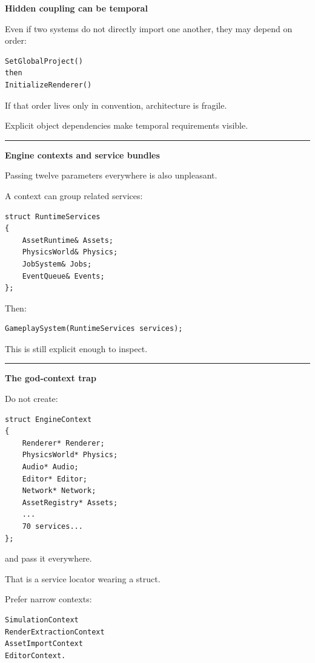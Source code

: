 \textbf{Hidden coupling can be temporal}

Even if two systems do not directly import one another, they may depend on order:

\begin{verbatim}
SetGlobalProject()
then
InitializeRenderer()
\end{verbatim}

If that order lives only in convention, architecture is fragile.

Explicit object dependencies make temporal requirements visible.

\begin{center}\rule{0.5\linewidth}{0.5pt}\end{center}

\textbf{Engine contexts and service bundles}

Passing twelve parameters everywhere is also unpleasant.

A context can group related services:

\begin{verbatim}
struct RuntimeServices
{
    AssetRuntime& Assets;
    PhysicsWorld& Physics;
    JobSystem& Jobs;
    EventQueue& Events;
};
\end{verbatim}

Then:

\begin{verbatim}
GameplaySystem(RuntimeServices services);
\end{verbatim}

This is still explicit enough to inspect.

\begin{center}\rule{0.5\linewidth}{0.5pt}\end{center}

\textbf{The god-context trap}

Do not create:

\begin{verbatim}
struct EngineContext
{
    Renderer* Renderer;
    PhysicsWorld* Physics;
    Audio* Audio;
    Editor* Editor;
    Network* Network;
    AssetRegistry* Assets;
    ...
    70 services...
};
\end{verbatim}

and pass it everywhere.

That is a service locator wearing a struct.

Prefer narrow contexts:

\begin{verbatim}
SimulationContext
RenderExtractionContext
AssetImportContext
EditorContext.
\end{verbatim}

